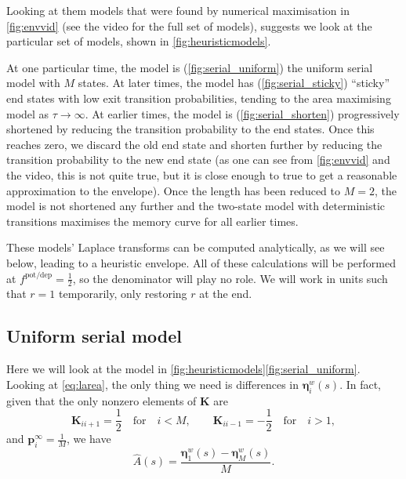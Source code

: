 \documentclass[12pt]{article}
\newcommand{\pr}{\mathbf{p}}
\newcommand{\eq}{\pr^\infty}
\newcommand{\etw}{\boldsymbol{\eta}^w}
\newcommand{\enc}{\mathbf{K}}
\newcommand{\potdep}{^{\text{pot/dep}}}
\begin{document}
Looking at them models that were found by numerical maximisation in \autoref{fig:envvid} (see the video for the full set of models), suggests we look at the particular set of models, shown in \autoref{fig:heuristicmodels}.

At one particular time, the model is (\ref{fig:serial_uniform}) the uniform serial model with $M$ states.
At later times, the model has (\ref{fig:serial_sticky}) ``sticky'' end states with low exit transition probabilities, tending to the area maximising model as $\tau\to\infty$.
At earlier times, the model is (\ref{fig:serial_shorten}) progressively shortened by reducing the transition probability to the end states.
Once this reaches zero, we discard the old end state and shorten further by reducing the transition probability to the new end state (as one can see from \autoref{fig:envvid} and the video, this is not quite true, but it is close enough to true to get a reasonable approximation to the envelope).
Once the length has been reduced to $M=2$, the model is not shortened any further and the two-state model with deterministic transitions maximises the memory curve for all earlier times.

These models' Laplace transforms can be computed analytically, as we will see below, leading to a heuristic envelope.
All of these calculations will be performed at $f\potdep=\frac{1}{2}$, so the denominator will play no role.
We will work in units such that $r=1$ temporarily, only restoring $r$ at the end.


\subsection{Uniform serial model}\label{sec:serial_uniform}


Here we will look at the model in \autoref{fig:heuristicmodels}\ref{fig:serial_uniform}.
Looking at \eqref{eq:larea}, the only thing we need is differences in $\etw_i(s)$.
In fact, given that the only nonzero elements of $\enc$ are
%
\begin{equation}\label{eq:unienc}
  \enc_{ii+1}=\frac{1}{2} \quad\text{for}\quad i<M,
  \qquad
  \enc_{ii-1}=-\frac{1}{2} \quad\text{for}\quad i>1,
\end{equation}
%
and $\eq_i = \frac{1}{M}$, we have
%
\begin{equation}\label{eq:uniareaeta}
  \hat{A}(s) = \frac{\etw_1(s) - \etw_M(s)}{M}.
\end{equation}
%
\end{document}
